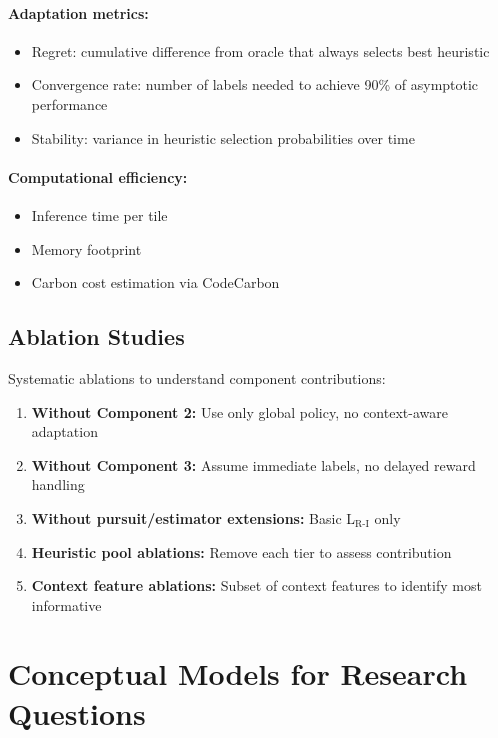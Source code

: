 \documentclass[12pt,oneside]{book}
\begin{document}
\paragraph{Adaptation metrics:}
\begin{itemize}
    \item Regret: cumulative difference from oracle that always selects best heuristic
    \item Convergence rate: number of labels needed to achieve 90\% of asymptotic performance
    \item Stability: variance in heuristic selection probabilities over time
\end{itemize}

\paragraph{Computational efficiency:}
\begin{itemize}
    \item Inference time per tile
    \item Memory footprint
    \item Carbon cost estimation via CodeCarbon
\end{itemize}

\subsection{Ablation Studies}
\label{subsec:ablation}

Systematic ablations to understand component contributions:

\begin{enumerate}
    \item \textbf{Without Component 2:} Use only global policy, no context-aware adaptation
    \item \textbf{Without Component 3:} Assume immediate labels, no delayed reward handling
    \item \textbf{Without pursuit/estimator extensions:} Basic L$_\text{R-I}$ only
    \item \textbf{Heuristic pool ablations:} Remove each tier to assess contribution
    \item \textbf{Context feature ablations:} Subset of context features to identify most informative
\end{enumerate}

\section{Conceptual Models for Research Questions}
\label{sec:conceptual-models}
\end{document}
